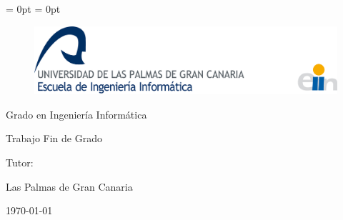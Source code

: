 \begin{titlepage}

\topmargin = 0pt
\headheight = 0pt

\begin{figure}
\includegraphics[width=15cm]{images/logo_eii.jpg}
\end{figure}

\begin{center}

\Large{Grado en Ingeniería Informática}

\vfill
\Large{Trabajo Fin de Grado}

\vfill
\Huge{\textbf{\myTitle}}

\vfill
\Large{\textbf{\myAuthor}}

\vfill
\Large{Tutor: \textbf{\tutor}}

\vfill
\large{Las Palmas de Gran Canaria}

\large{\today}

\end{center}


\end{titlepage}
\makeatother